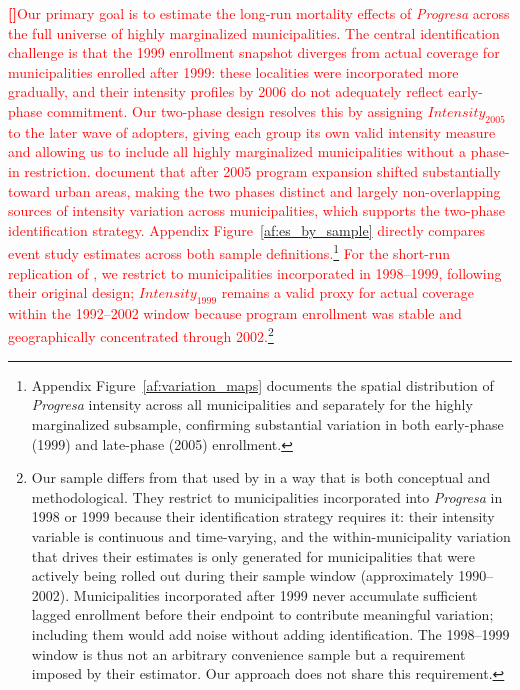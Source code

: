 \documentclass[12pt]{article}
\newcounter{paragraphnum}
\newcommand{\p}{\refstepcounter{paragraphnum}\textbf{[\theparagraphnum]}\enspace}
\begin{document}
\textcolor{red}{\p Our primary goal is to estimate the long-run mortality effects of \textit{Progresa} across the full universe of highly marginalized municipalities. The central identification challenge is that the 1999 enrollment snapshot diverges from actual coverage for municipalities enrolled after 1999: these localities were incorporated more gradually, and their intensity profiles by 2006 do not adequately reflect early-phase commitment. Our two-phase design resolves this by assigning $\textit{Intensity}_{2005}$ to the later wave of adopters, giving each group its own valid intensity measure and allowing us to include all highly marginalized municipalities without a phase-in restriction. \cite{parker2023conditional} document that after 2005 program expansion shifted substantially toward urban areas, making the two phases distinct and largely non-overlapping sources of intensity variation across municipalities, which supports the two-phase identification strategy. Appendix Figure~\ref{af:es_by_sample} directly compares event study estimates across both sample definitions.\footnote{Appendix Figure~\ref{af:variation_maps} documents the spatial distribution of \textit{Progresa} intensity across all municipalities and separately for the highly marginalized subsample, confirming substantial variation in both early-phase (1999) and late-phase (2005) enrollment.} For the short-run replication of \cite{BarhamRowberry2013JDE}, we restrict to municipalities incorporated in 1998--1999, following their original design; $\textit{Intensity}_{1999}$ remains a valid proxy for actual coverage within the 1992--2002 window because program enrollment was stable and geographically concentrated through 2002.\footnote{Our sample differs from that used by \cite{BarhamRowberry2013JDE} in a way that is both conceptual and methodological. They restrict to municipalities incorporated into \textit{Progresa} in 1998 or 1999 because their identification strategy requires it: their intensity variable is continuous and time-varying, and the within-municipality variation that drives their estimates is only generated for municipalities that were actively being rolled out during their sample window (approximately 1990--2002). Municipalities incorporated after 1999 never accumulate sufficient lagged enrollment before their endpoint to contribute meaningful variation; including them would add noise without adding identification. The 1998--1999 window is thus not an arbitrary convenience sample but a requirement imposed by their estimator. Our approach does not share this requirement.}}
\end{document}

